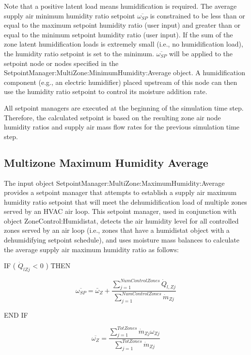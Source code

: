 Note that a positive latent load means humidification is required. The average supply air minimum humidity ratio setpoint \({\overline{\omega_{SP}}}\) is constrained to be less than or equal to the maximum setpoint humidity ratio (user input) and greater than or equal to the minimum setpoint humidity ratio (user input). If the sum of the zone latent humidification loads is extremely small (i.e., no humidification load), the humidity ratio setpoint is set to the minimum. \({\overline{\omega_{SP}}}\) will be applied to the setpoint node or nodes specified in the SetpointManager:MultiZone:MinimumHumidity:Average object. A humidification component (e.g., an electric humidifier) placed upstream of this node can then use the humidity ratio setpoint to control its moisture addition rate.

All setpoint managers are executed at the beginning of the simulation time step. Therefore, the calculated setpoint is based on the resulting zone air node humidity ratios and supply air mass flow rates for the previous simulation time step.

\subsection{Multizone Maximum Humidity Average}\label{multizone-maximum-humidity-average}

The input object SetpointManager:MultiZone:MaximumHumidity:Average provides a setpoint manager that attempts to establish a supply air maximum humidity ratio setpoint that will meet the dehumidification load of multiple zones served by an HVAC air loop. This setpoint manager, used in conjunction with object ZoneControl:Humidistat, detects the air humidity level for all controlled zones served by an air loop (i.e., zones that have a humidistat object with a dehumidifying setpoint schedule), and uses moisture mass balances to calculate the average supply air maximum humidity ratio as follows:

IF ( \({\dot Q_{lZj}}\) \textless{} 0 ) THEN

\begin{equation}
  \overline{{\omega}_{SP}} = \bar{\omega}_Z + \frac{\sum\limits_{j = 1}^{NumControlZones}\dot{Q}_{l,Zj}}{\sum\limits_{j = 1}^{NumControlZones}\dot{m}_{Zj}}
\end{equation}

END IF

\begin{equation}
  \overline{{\omega}_{Z}} = \frac{\sum\limits_{j = 1}^{TotZones}\dot{m}_{Zj}\omega_{Zj}}{\sum\limits_{j = 1}^{TotZones}\dot{m}_{Zj}}
\end{equation}

